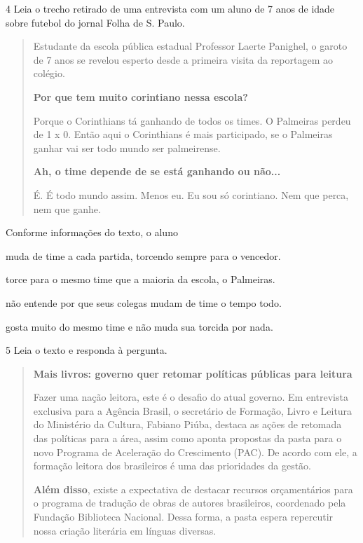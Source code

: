 \num{4} Leia o trecho retirado de uma entrevista com um aluno de 7 anos
de idade sobre futebol do jornal Folha de S. Paulo.

\begin{quote}
Estudante da escola pública estadual Professor Laerte Panighel, o garoto
de 7 anos se revelou esperto desde a primeira visita da reportagem ao
colégio.

\textbf{Por que tem muito corintiano nessa escola?}

Porque o Corinthians tá ganhando de todos os times. O Palmeiras perdeu
de 1 x 0. Então aqui o Corinthians é mais participado, se o
Palmeiras ganhar vai ser todo mundo ser palmeirense.

\textbf{Ah, o time depende de se está ganhando ou não...}

É. É todo mundo assim. Menos eu. Eu sou só corintiano. Nem que perca,
nem que ganhe.
\end{quote}


Conforme informações do texto, o aluno

\begin{escolha}
\item muda de time a cada partida, torcendo sempre para o vencedor.

\item torce para o mesmo time que a maioria da escola, o Palmeiras.

\item não entende por que seus colegas mudam de time o tempo todo.

\item gosta muito do mesmo time e não muda sua torcida por nada.
\end{escolha}



\num{5} Leia o texto e responda à pergunta.

\begin{quote}
\textbf{Mais livros: governo quer retomar políticas públicas para leitura}

Fazer uma nação leitora, este é o desafio do atual governo. Em
entrevista exclusiva para a Agência Brasil, o secretário de Formação,
Livro e Leitura do Ministério da Cultura, Fabiano Piúba, destaca as
ações de retomada das políticas para a área, assim como aponta propostas
da pasta para o novo Programa de Aceleração do Crescimento (PAC). De
acordo com ele, a formação leitora dos brasileiros é uma das prioridades
da gestão.

\textbf{Além disso}, existe a expectativa de destacar recursos orçamentários
para o programa de tradução de obras de autores brasileiros, coordenado
pela Fundação Biblioteca Nacional. Dessa forma, a pasta espera
repercutir nossa criação literária em línguas diversas.
\end{quote}

